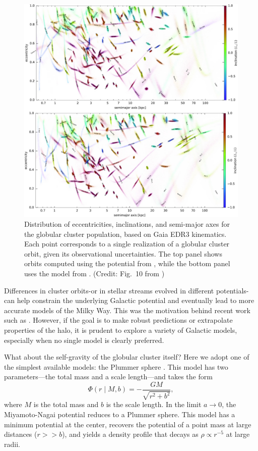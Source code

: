         \begin{figure}
            \includegraphics[width=\linewidth]{images/vasiliev_2021_EDR3_GCS_FIG_10.jpeg}
            \caption{Distribution of eccentricities, inclinations, and semi-major axes for the globular cluster population, based on Gaia EDR3 kinematics. Each point corresponds to a single realization of a globular cluster orbit, given its observational uncertainties. The top panel shows orbits computed using the potential from \citet{2017MNRAS.465...76M}, while the bottom panel uses the model from \citet{2015ApJS..216...29B}. (Credit: Fig.~10 from \citet{2021MNRAS.505.5978V})}
            \label{fig:vasiliev_2021_EDR3_GCS_FIG_10}
        \end{figure}

        Differences in cluster orbits-or in stellar streams evolved in different potentials-can help constrain the underlying Galactic potential and eventually lead to more accurate models of the Milky Way. This was the motivation behind recent work such as \citet{2024ApJ...967...89I}. However, if the goal is to make robust predictions or extrapolate properties of the halo, it is prudent to explore a variety of Galactic models, especially when no single model is clearly preferred.

        What about the self-gravity of the globular cluster itself? Here we adopt one of the simplest available models: the Plummer sphere \citep{1911MNRAS..71..460P}. This model has two parameters—the total mass and a scale length—and takes the form
        \begin{equation} \label{eq:plummer}
            \Phi(r \mid M, b) = -\frac{G M}{\sqrt{r^2 + b^2}},
        \end{equation}
        where $M$ is the total mass and $b$ is the scale length. In the limit $a \rightarrow 0$, the Miyamoto-Nagai potential reduces to a Plummer sphere. This model has a minimum potential at the center, recovers the potential of a point mass at large distances ($r >> b$), and yields a density profile that decays as $\rho \propto r^{-5}$ at large radii.

